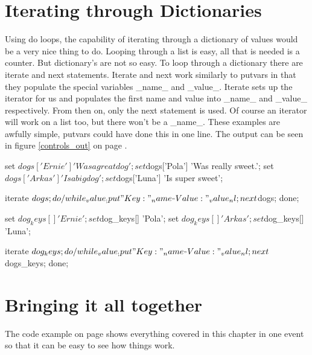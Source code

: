 \section{Iterating through Dictionaries}
Using do loops, the capability of iterating through a dictionary of values would be a 
very nice thing
to do.  Looping through a list is easy, all that is needed is a counter.  But dictionary's are
not so easy.  To loop through a dictionary there are iterate and next statements.  
Iterate and next work similarly to putvars in that they populate the special variables
\_name\_ and \_value\_.  Iterate
sets up the iterator for us and populates the first name and value into \_name\_ and \_value\_
respectively.  From then on, only the next statement is used.  Of course an iterator will
work on a list too, but there won't be a \_name\_.  These examples are awfully simple, putvars 
could have done this in one line.  The output can be seen in figure \ref{controls_out} on page
\pageref{controls_out}.

\begin{sfvcode}

      set $dogs['Ernie'] 'Was a great dog';
      set $dogs['Pola'] 'Was really sweet.';
      set $dogs['Arkas'] 'Is a big dog';
      set $dogs['Luna'] 'Is super sweet';

      iterate $dogs;
      do /while _value_;
          put "Key: " _name_ " Value: " _value_ nl;
          next $dogs;
      done;

      set $dog_keys[] 'Ernie';
      set $dog_keys[] 'Pola';
      set $dog_keys[] 'Arkas';
      set $dog_keys[] 'Luna';

      iterate $dog_keys;
      do /while _value_;
          put "Key: " _name_ " Value: " _value_ nl;
          next $dogs_keys;
      done;

\end{sfvcode}


\section{Bringing it all together}
The code example on page \pageref{controls example} shows 
everything covered in this chapter in one event
so that it can be easy to see how things work.

